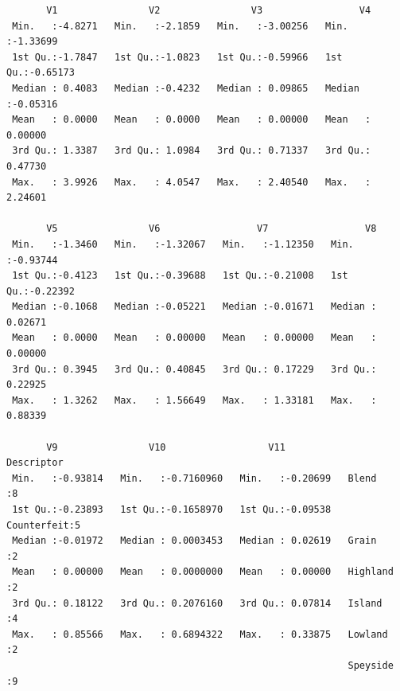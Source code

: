 \documentclass[
  letterpaper,
  DIV=11,
  numbers=noendperiod]{scrartcl}
\newenvironment{Shaded}{\begin{snugshade}}{\end{snugshade}}
\newcommand{\FunctionTok}[1]{\textcolor[rgb]{0.28,0.35,0.67}{#1}}
\newcommand{\NormalTok}[1]{\textcolor[rgb]{0.00,0.23,0.31}{#1}}
\newcommand{\OtherTok}[1]{\textcolor[rgb]{0.00,0.23,0.31}{#1}}
\newcommand{\SpecialCharTok}[1]{\textcolor[rgb]{0.37,0.37,0.37}{#1}}
\begin{document}
\begin{Shaded}
\end{Shaded}

\begin{verbatim}
       V1                V2                V3                 V4          
 Min.   :-4.8271   Min.   :-2.1859   Min.   :-3.00256   Min.   :-1.33699  
 1st Qu.:-1.7847   1st Qu.:-1.0823   1st Qu.:-0.59966   1st Qu.:-0.65173  
 Median : 0.4083   Median :-0.4232   Median : 0.09865   Median :-0.05316  
 Mean   : 0.0000   Mean   : 0.0000   Mean   : 0.00000   Mean   : 0.00000  
 3rd Qu.: 1.3387   3rd Qu.: 1.0984   3rd Qu.: 0.71337   3rd Qu.: 0.47730  
 Max.   : 3.9926   Max.   : 4.0547   Max.   : 2.40540   Max.   : 2.24601  
                                                                          
       V5                V6                 V7                 V8          
 Min.   :-1.3460   Min.   :-1.32067   Min.   :-1.12350   Min.   :-0.93744  
 1st Qu.:-0.4123   1st Qu.:-0.39688   1st Qu.:-0.21008   1st Qu.:-0.22392  
 Median :-0.1068   Median :-0.05221   Median :-0.01671   Median : 0.02671  
 Mean   : 0.0000   Mean   : 0.00000   Mean   : 0.00000   Mean   : 0.00000  
 3rd Qu.: 0.3945   3rd Qu.: 0.40845   3rd Qu.: 0.17229   3rd Qu.: 0.22925  
 Max.   : 1.3262   Max.   : 1.56649   Max.   : 1.33181   Max.   : 0.88339  
                                                                           
       V9                V10                  V11                 Descriptor
 Min.   :-0.93814   Min.   :-0.7160960   Min.   :-0.20699   Blend      :8   
 1st Qu.:-0.23893   1st Qu.:-0.1658970   1st Qu.:-0.09538   Counterfeit:5   
 Median :-0.01972   Median : 0.0003453   Median : 0.02619   Grain      :2   
 Mean   : 0.00000   Mean   : 0.0000000   Mean   : 0.00000   Highland   :2   
 3rd Qu.: 0.18122   3rd Qu.: 0.2076160   3rd Qu.: 0.07814   Island     :4   
 Max.   : 0.85566   Max.   : 0.6894322   Max.   : 0.33875   Lowland    :2   
                                                            Speyside   :9   
\end{verbatim}
\end{document}
